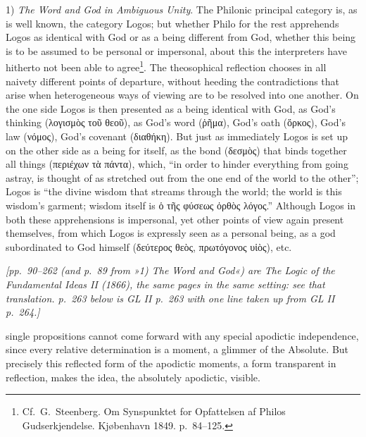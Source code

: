 \documentclass[12pt,a4paper,openany]{book}
\newcommand{\opage}[1]{\marginnote{\footnotesize\textit{[#1]}}}
\newcommand{\editorial}[1]{\par\medskip\begin{center}\small\textit{[#1]}\end{center}\medskip\par}
\begin{document}
1) \emph{The Word and God in Ambiguous Unity}. The Philonic principal category is, as is well known, the category
Logos; but whether Philo for the rest apprehends Logos as identical with God or as a being different from God, whether
this being is to be assumed to be personal or impersonal, about this the interpreters have hitherto not been able to
agree\footnote[1]{Cf.\ G.\ Steenberg. Om Synspunktet for Opfattelsen af Philos Gudserkjendelse. Kjøbenhavn 1849.
p.~84--125.}. The theosophical reflection chooses in all naivety different points of departure, without heeding the
contradictions that arise when heterogeneous ways of viewing are to be resolved into one another. On the one side
Logos is then presented as a being identical with God, as God's thinking (λογισμὸς τοῦ θεοῦ), as God's word (ῥῆμα),
God's oath (ὅρκος), God's law (νόμος), God's covenant (διαθήκη). But just as immediately Logos is set up on the other
side as a being for itself, as the bond (δεσμὸς) that binds together all things (περιέχων τὰ πάντα), which, ``in
order to hinder everything from going astray, is thought of as stretched out from the one end of the world to the
other''; Logos is ``the divine wisdom that streams through the world; the world is this wisdom's garment; wisdom
itself is ὁ τῆς φύσεως ὀρθὸς λόγος.'' Although Logos in both these apprehensions is impersonal, yet other points of
view again present themselves, from which Logos is expressly seen as a personal being, as a god subordinated to God
himself (δεύτερος θεὸς, πρωτόγονος υἱὸς), etc.

\editorial{pp.~90--262 (and p.~89 from »1) The Word and God«) are \emph{The Logic of the Fundamental Ideas II}
(1866), the same pages in the same setting: see that translation.  p.~263 below is GL II p.~263 with one line taken
up from GL II p.~264.}

\opage{263}single propositions cannot come forward with any special apodictic independence, since every relative
determination is a moment, a glimmer of the Absolute. But precisely this reflected form of the apodictic moments, a
form transparent in reflection, makes the idea, the absolutely apodictic, visible.
\end{document}
